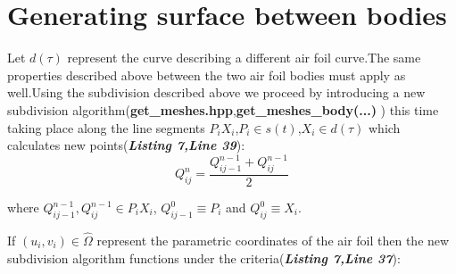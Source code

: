 \documentclass[12pt,a4paper]{article}
\begin{document}
\newpage
\section{Generating surface between bodies}
Let $d(\tau)$ represent the curve describing a different air foil curve.The same properties described above between the two air foil bodies must apply as well.Using  the subdivision described above we proceed by introducing a new subdivision algorithm(\textbf{{get\_meshes.hpp}},\textbf{get\_meshes\_body(...)} ) this time taking place along the line segments $P_{i}X_{i}$,$P_{i} \in s(t)$,$X_{i} \in d(\tau)$ which calculates new points(\textbf{\textit{Listing 7,Line 39}}): $$Q_{ij}^{n}=\frac{Q_{ij-1}^{n-1}+Q_{ij}^{n-1}}{2}$$

where $Q_{ij-1}^{n-1},Q_{ij}^{n-1} \in P_{i}X_{i}$, $Q_{ij-1}^{0}\equiv P_i$ and $Q_{ij}^{0}\equiv X_i$.

If $(u_{i},v_{i}) \in \widehat{\Omega} $  represent the parametric coordinates of the air foil then the new subdivision algorithm functions  under the criteria(\textbf{\textit{Listing 7,Line 37}}):

\begin{frame}

\begin{minipage}{.45\linewidth}
\begin{center}

\begin{algorithm}[H]


\end{algorithm}

\end{center}
\end{minipage}
\end{frame}
\end{document}
